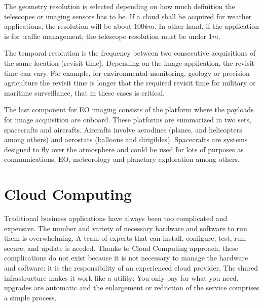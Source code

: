 
The geometry resolution is selected depending on how much definition the
telescopes or imaging sensors has to be. If a cloud shall be acquired for
weather applications, the resolution will be about $100km$. In
other hand, if the application is for traffic management, the telescope
resolution must be under $1m$.

The temporal resolution is the frequency between two consecutive
acquisitions of the same location (revisit time). Depending on the image
application, the revisit time can vary. For example, for environmental
monitoring, geology or precision agriculture the revisit time is longer that the
required revisit time for military or maritime surveillance, that
in these cases is critical.

The last component for \ac{EO} imaging consists of the platform where the
payloads for image acquisition are onboard. These platforms are summarized in two sets, spacecrafts and
aircrafts. Aircrafts involve aerodines (planes, and helicopters among
others) and aerostats (balloons and dirigibles). Spacecrafts are systems designed
to fly over the atmosphere and could be used for lots of purposes as communications, \ac{EO},
meteorology and planetary exploration among others.


\section{Cloud Computing}

Traditional business applications have always been too complicated and
expensive. The number and variety of necessary hardware and software to run them
is overwhelming. A team of experts that can install, configure, test, run,
secure, and update is needed.
Thanks to Cloud Computing approach, these
complications do not exist because it is not necessary to manage the hardware
and software: it is the responsibility of an experienced cloud provider. The
shared infrastructure makes it work like a utility: You only pay for what you
need, upgrades are automatic and the enlargement or reduction of the service
comprises a simple process.

